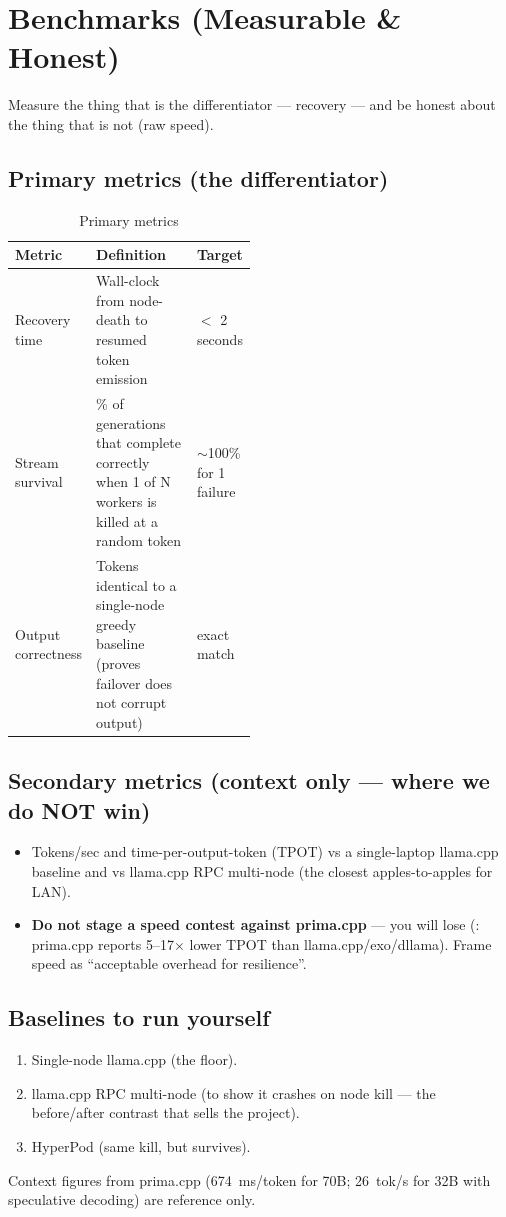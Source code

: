 \section{Benchmarks (Measurable \& Honest)}
\label{sec:benchmarks}

Measure the thing that is the differentiator --- recovery --- and be honest
about the thing that is not (raw speed).

\subsection{Primary metrics (the differentiator)}
\begin{table}[h]
\centering\footnotesize
\caption{Primary metrics}
\label{tab:primary}
\begin{tabularx}{\linewidth}{L{0.30\linewidth}Y L{0.18\linewidth}}
\toprule
Metric & Definition & Target \\
\midrule
Recovery time & Wall-clock from node-death to resumed token emission &
$<$ 2 seconds \\
Stream survival & \% of generations that complete correctly when 1 of N workers
is killed at a random token & $\sim$100\% for 1 failure \\
Output correctness & Tokens identical to a single-node greedy baseline (proves
failover does not corrupt output) & exact match \\
\bottomrule
\end{tabularx}
\end{table}

\subsection{Secondary metrics (context only --- where we do NOT win)}
\begin{itemize}[leftmargin=1.4em,nosep]
  \item Tokens/sec and time-per-output-token (TPOT) vs a single-laptop llama.cpp
  baseline and vs llama.cpp RPC multi-node (the closest apples-to-apples for LAN).
  \item \textbf{Do not stage a speed contest against prima.cpp} --- you will lose
  (\VER: prima.cpp reports 5--17$\times$ lower TPOT than llama.cpp/exo/dllama).
  Frame speed as ``acceptable overhead for resilience''.
\end{itemize}

\subsection{Baselines to run yourself}
\begin{enumerate}[leftmargin=1.6em,nosep]
  \item Single-node llama.cpp (the floor).
  \item llama.cpp RPC multi-node (to show it crashes on node kill --- the
  before/after contrast that sells the project).
  \item HyperPod (same kill, but survives).
\end{enumerate}
Context figures from prima.cpp (674~ms/token for 70B; 26~tok/s for 32B with
speculative decoding) are reference only. \VER
